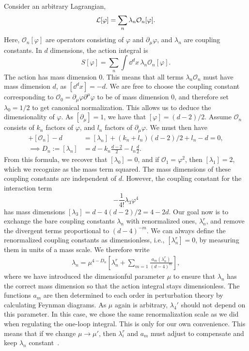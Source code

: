 Consider an arbitrary Lagrangian, 
%
\begin{equation}
    \mathcal{L}[\varphi] = \sum_n \lambda_n \mathcal{O}_n[\varphi].
\end{equation}
%
Here, $\mathcal{O}_n[\varphi]$ are operators consisting of $\varphi$ and $\partial_\mu \varphi$, and $\lambda_n$ are coupling constants.
In $d$ dimensions, the action integral is
%
\begin{equation}
    S[\varphi] = \sum_n \int \dd^d x \, \lambda_n \mathcal{O}_n[\varphi].
\end{equation}
%
The action has mass dimension $0$.
This means that all terms $\lambda_n \mathcal O_n$ must have mass dimension $d$, as $[\dd^d x] = -d$.
We are free to choose the coupling constant corresponding to $\mathcal O_0 = \partial_\mu \varphi \partial^\mu \varphi$ to be of mass dimension 0, and therefore set $\lambda_0 = 1/2$ to get canonical normalization.
This allows us to deduce the dimensionality of $\varphi$.
As $[\partial_\mu] = 1$, we have that $[\varphi] = (d-2)/2$.
Assume $\mathcal O_n$ consists of $k_n$ factors of $\varphi$, and $l_n$ factors of $\partial_\mu \varphi$.
We must then have
%
\begin{align}
    [\lambda_n] + [\mathcal{O}_n] - d &= [\lambda_n] + (k_n + l_n)(d - 2) / 2 + l_n - d = 0, \\
    \implies D_n := [\lambda_n] &= d - k_n \frac{d - 2}{2} - l_n \frac{d}{2}.
\end{align}
%
From this formula, we recover that $[\lambda_0] = 0$, and if $\mathcal O_1 = \varphi^2$, then $[\lambda_1] = 2$, which we recognize as the mass term squared.
The mass dimensions of these coupling constants are independent of $d$.
However, the coupling constant for the interaction term
\begin{equation}
    - \frac{1}{4!} \lambda_3 \varphi^4
\end{equation}
has mass dimensions $[\lambda_3] = d -4(d-2)/2 = 4 - 2d$.
Our goal now is to exchange the bare coupling constants $\lambda_n$ with renormalized ones, $\lambda_n^r$, and remove the divergent terms proportional to $(d - 4)^{-m}$.
We can always define the renormalized coupling constants as dimensionless, i.e., $[\lambda_n^r] = 0$, by measuring them in units of a mass scale.
We therefore write 
%
\begin{align*}
    \lambda_n = \mu^{4 - D_n}
    \left[
        \lambda_n^r + \sum_{m=1} \frac{a_m(\lambda_n^r)}{(d - 4)^{m}}
    \right],
\end{align*}
%
where we have introduced the dimensionful parameter $\mu$ to ensure that $\lambda_n$ has the correct mass dimension so that the action integral stays dimensionless.
The functions $a_m$ are then determined to each order in perturbation theory by calculating Feynman diagrams.
As $\mu$ again is arbitrary, $\lambda_4'$ should not depend on this parameter.
In this case, we chose the same renormalization scale as we did when regulating the one-loop integral.
This is only for our own convenience.
This means that if we change $\mu \rightarrow \mu'$, then $\lambda_i^r$ and $a_m$ must adjust to compensate and keep $\lambda_n$ constant~\autocite{thooftDimensionalRegularizationRenormalization1973}.

